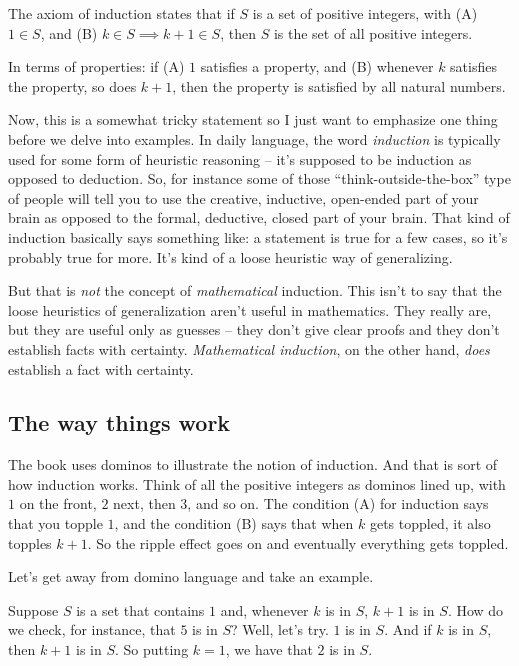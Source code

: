 \documentclass{amsart}
\begin{document}
The axiom of induction states that if $S$ is a set of positive
integers, with (A) $1 \in S$, and (B) $k \in S \implies k + 1 \in S$,
then $S$ is the set of all positive integers.

In terms of properties: if (A) $1$ satisfies a property, and (B) whenever $k$
satisfies the property, so does $k + 1$, then the property is
satisfied by all natural numbers.

Now, this is a somewhat tricky statement so I just want to emphasize
one thing before we delve into examples. In daily language, the word
{\em induction} is typically used for some form of heuristic reasoning
-- it's supposed to be induction as opposed to deduction. So, for
instance some of those ``think-outside-the-box'' type of people will
tell you to use the creative, inductive, open-ended part of your brain
as opposed to the formal, deductive, closed part of your brain. That
kind of induction basically says something like: a statement is true
for a few cases, so it's probably true for more. It's kind of a loose
heuristic way of generalizing.

But that is {\em not} the concept of {\em mathematical}
induction. This isn't to say that the loose heuristics of
generalization aren't useful in mathematics. They really are, but they
are useful only as guesses -- they don't give clear proofs and they
don't establish facts with certainty. {\em Mathematical induction}, on
the other hand, {\em does} establish a fact with certainty.

\subsection{The way things work}

The book uses dominos to illustrate the notion of induction. And that
is sort of how induction works. Think of all the positive integers as
dominos lined up, with $1$ on the front, $2$ next, then $3$, and so
on. The condition (A) for induction says that you topple $1$, and the
condition (B) says that when $k$ gets toppled, it also topples $k +
1$. So the ripple effect goes on and eventually everything gets
toppled.

Let's get away from domino language and take an example.

Suppose $S$ is a set that contains $1$ and, whenever $k$ is in $S$, $k
+ 1$ is in $S$. How do we check, for instance, that $5$ is in $S$?
Well, let's try. $1$ is in $S$. And if $k$ is in $S$, then $k + 1$ is
in $S$. So putting $k = 1$, we have that $2$ is in $S$.
\end{document}

